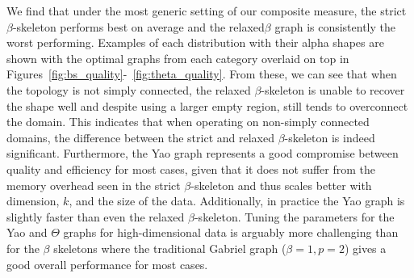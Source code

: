 %
We find that under the most generic setting of our composite measure, the strict $\beta$-skeleton performs best on average and the relaxed$\beta$ graph is consistently the worst performing.
%
Examples of each distribution with their alpha shapes are shown with the optimal graphs from each category overlaid on top in Figures~\ref{fig:bs_quality}-~\ref{fig:theta_quality}.
%
From these, we can see that when the topology is not simply connected, the relaxed $\beta$-skeleton is unable to recover the shape well and despite using a larger empty region, still tends to overconnect the domain.
%
This indicates that when operating on non-simply connected domains, the difference between the strict and relaxed $\beta$-skeleton is indeed significant.
%
Furthermore, the Yao graph represents a good compromise between quality and efficiency for most cases, given that it does not suffer from the memory overhead seen in the strict $\beta$-skeleton and thus scales better with dimension, $k$, and the size of the data.
%
Additionally, in practice the Yao graph is slightly faster than even the relaxed $\beta$-skeleton.
%
Tuning the parameters for the Yao and $\Theta$ graphs for high-dimensional data is arguably more challenging than for the $\beta$ skeletons where the traditional Gabriel graph ($\beta=1, p=2$) gives a good overall performance for most cases.


